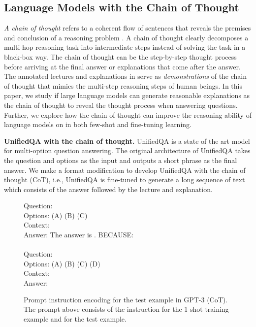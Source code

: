 \subsection{Language Models with the Chain of Thought}
\textit{A chain of thought} refers to a coherent flow of sentences that reveals the premises and conclusion of a reasoning problem \cite{wei2022chain}. A chain of thought clearly decomposes a multi-hop reasoning task into intermediate steps instead of solving the task in a black-box way. The chain of thought can be the step-by-step thought process \cite{wei2022chain} before arriving at the final answer or explanations \cite{narang2020wt5} that come after the answer. The annotated lectures and explanations in \name{} serve as \emph{demonstrations} of the chain of thought that mimics the multi-step reasoning steps of human beings. In this paper, we study if large language models can generate reasonable explanations as the chain of thought to reveal the thought process when answering \name{} questions. Further, we explore how the chain of thought can improve the reasoning ability of language models on \name{} in both few-shot and fine-tuning learning.


\textbf{UnifiedQA with the chain of thought.} UnifiedQA \cite{khashabi2020unifiedqa} is a state of the art model for multi-option question answering. The original architecture of UnifiedQA takes the question and options as the input and outputs a short phrase as the final answer. We make a format modification to develop UnifiedQA with the chain of thought (CoT), i.e., UnifiedQA is fine-tuned to generate a long sequence of text which consists of the answer followed by the lecture and explanation.
 
 \begin{figure}[t!]
\vspace{-1mm}
\centering
\footnotesize
\fontsize{8.5pt}{\baselineskip}\selectfont \begin{boxedminipage}{0.98\columnwidth}
Question:   \\
Options: (A)   (B)   (C)   \\
Context:    \\
Answer: The answer is  . BECAUSE:   ~   \\
\\
Question:   \\
Options: (A)   (B)   (C)   (D)  \\
Context:   \\
Answer:
\end{boxedminipage}
\caption{Prompt instruction encoding for the test example  in GPT-3 (CoT). The prompt above consists of the instruction  for the 1-shot training example and  for the test example.}
\vspace{-1mm}
\label{fig:prompt_encoding}
\end{figure}

